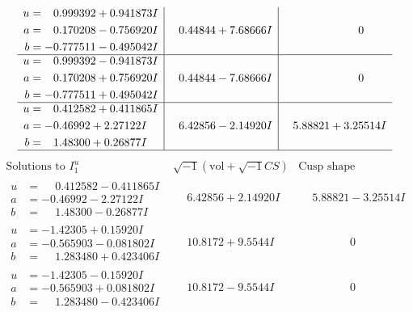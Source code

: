 \documentclass[1p]{elsarticle_modified}
\theoremstyle{definition}
\newcommand{\I}{\sqrt{-1}}
\begin{document}
$$\begin{array}{c|c|c}
\begin{aligned}
u &= \phantom{-}0.999392 + 0.941873 I \\
a &= \phantom{-}0.170208 - 0.756920 I \\
b &= -0.777511 - 0.495042 I\end{aligned}
 & \phantom{-}0.44844 + 7.68666 I & \phantom{-0.000000 } 0 \\ \hline\begin{aligned}
u &= \phantom{-}0.999392 - 0.941873 I \\
a &= \phantom{-}0.170208 + 0.756920 I \\
b &= -0.777511 + 0.495042 I\end{aligned}
 & \phantom{-}0.44844 - 7.68666 I & \phantom{-0.000000 } 0 \\ \hline\begin{aligned}
u &= \phantom{-}0.412582 + 0.411865 I \\
a &= -0.46992 + 2.27122 I \\
b &= \phantom{-}1.48300 + 0.26877 I\end{aligned}
 & \phantom{-}6.42856 - 2.14920 I & \phantom{-}5.88821 + 3.25514 I\\
 \hline 
 \end{array}$$\newpage$$\begin{array}{c|c|c}  
\text{Solutions to }I^u_{1}& \I (\text{vol} + \sqrt{-1}CS) & \text{Cusp shape}\\
 \hline 
\begin{aligned}
u &= \phantom{-}0.412582 - 0.411865 I \\
a &= -0.46992 - 2.27122 I \\
b &= \phantom{-}1.48300 - 0.26877 I\end{aligned}
 & \phantom{-}6.42856 + 2.14920 I & \phantom{-}5.88821 - 3.25514 I \\ \hline\begin{aligned}
u &= -1.42305 + 0.15920 I \\
a &= -0.565903 - 0.081802 I \\
b &= \phantom{-}1.283480 + 0.423406 I\end{aligned}
 & \phantom{-}10.8172 + 9.5544 I & \phantom{-0.000000 } 0 \\ \hline\begin{aligned}
u &= -1.42305 - 0.15920 I \\
a &= -0.565903 + 0.081802 I \\
b &= \phantom{-}1.283480 - 0.423406 I\end{aligned}
 & \phantom{-}10.8172 - 9.5544 I & \phantom{-0.000000 } 0 \\ \hline\begin{aligned}

\end{aligned}
\end{array}$$
\end{document}
